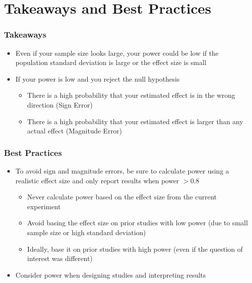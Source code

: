 \documentclass[slidestop,compress,mathserif]{beamer}
\begin{document}
\section{Takeaways and Best Practices}
\begin{frame}
	\frametitle{Takeaways}
	\begin{itemize}
		\item Even if your sample size looks large, your power could be low if the population standard deviation is large or the effect size is small
		\item If your power is low and you reject the null hypothesis
		\begin{itemize}
			\item There is a high probability that your estimated effect is in the wrong direction (Sign Error)
			\item There is a high probability that your estimated effect is larger than any actual effect (Magnitude Error)
		\end{itemize}
	\end{itemize}
\end{frame}

\begin{frame}
	\frametitle{Best Practices}
	\begin{itemize}
		\item To avoid sign and magnitude errors, be sure to calculate power using a realistic effect size and only report results when power $>0.8$
		\begin{itemize}
			\item Never calculate power based on the effect size from the current experiment
			\item Avoid basing the effect size on prior studies with low power (due to small sample size or high standard deviation)
			\item Ideally, base it on prior studies with high power (even if the question of interest was different)
		\end{itemize}
		\item Consider power when designing studies and interpreting results
	\end{itemize}
\end{frame}


\end{document}
